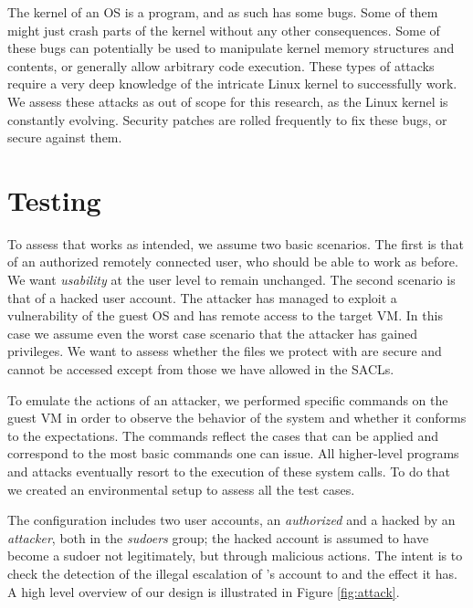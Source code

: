 \par The kernel of an \ac{OS} is a program, and as such has some bugs. Some of them might just crash parts of the kernel without any other consequences. Some of these bugs can potentially be used to manipulate kernel memory structures and contents, or generally allow arbitrary code execution. These types of attacks require a very deep knowledge of the intricate Linux kernel to successfully work. We assess these attacks as out of scope for this research, as the Linux kernel is constantly evolving. Security patches are rolled frequently to fix these bugs, or secure against them.

\section{Testing}\label{sec:testing}

\par To assess that  works as intended, we assume two basic scenarios. The first is that of an authorized remotely connected user, who should be able to work as before. We want \emph{usability} at the user level to remain unchanged. The second scenario is that of a hacked user account. The attacker has managed to exploit a vulnerability of the guest \ac{OS} and has remote access to the target \ac{VM}. In this case we assume even the worst case scenario that the attacker has gained  privileges. We want to assess whether the files we protect with  are secure and cannot be accessed except from those we have allowed in the \acp{SACL}.

\par To emulate the actions of an attacker, we performed specific commands on the guest \ac{VM} in order to observe the behavior of the system and whether it conforms to the expectations. The commands reflect the cases that  can be applied and correspond to the most basic commands one can issue. All higher-level programs and attacks eventually resort to the execution of these system calls. To do that we created an environmental setup to assess all the test cases. 

\par The configuration includes two user accounts, an \emph{authorized} and a hacked by an \emph{attacker}, both in the \emph{sudoers} group; the hacked account is assumed to have become a sudoer not legitimately, but through malicious actions. The intent is to check the detection of the illegal escalation of 's account to  and the effect it has. A high level overview of our design is illustrated in Figure \ref{fig:attack}. 

